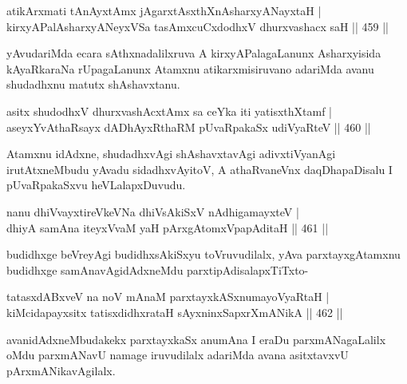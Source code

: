 \begin{shl}
atikArxmati tAnAyxtAmx jAgarxtAsxthXnAsharxyANayxtaH | \\
kirxyAPalAsharxyANeyxVSa tasAmxcuCxdodhxV dhurxvashacx saH \hfill||  459 ||  
\end{shl}

\begin{artha}
yAvudariMda ecara sAthxnadalilxruva A kirxyAPalagaLanunx Asharxyisida kAyaRkaraNa rUpagaLanunx Atamxnu atikarxmisiruvano adariMda avanu shudadhxnu matutx shAshavxtanu.
\end{artha}

\begin{shl}
asitx shudodhxV dhurxvashAcx\s \s tAmx sa ceYka iti yatisxthXtamf | \\
aseyxYvAthaRsayx dADhAyxRthaRM pUvaRpakaSx udiVyaRteV \hfill||  460 ||  
\end{shl}

\begin{artha}
Atamxnu idAdxne, shudadhxvAgi shAshavxtavAgi adivxtiVyanAgi irutAtxneMbudu yAvadu sidadhxvAyitoV, A athaRvaneVnx daqDhapaDisalu I pUvaRpakaSxvu heVLalapxDuvudu.
\end{artha}


\begin{shl}
nanu dhiVvayxtireVkeVNa dhiVsAkiSxV nAdhigamayxteV | \\
dhiyA samAna iteyxVvaM yaH pArxgAtomxVpapAditaH \hfill||  461 ||  
\end{shl}

\begin{artha}
budidhxge beVreyAgi budidhxsAkiSxyu toVruvudilalx, yAva parxtayxgAtamxnu budidhxge samAnavAgidAdxneMdu parxtipAdisalapxTiTxto- 
\end{artha}

\begin{shl}
tatasxdABxveV na noV mAnaM parxtayxkASxnumayoVyaRtaH | \\
kiMcidapayxsitx tatisxdidhxrataH sAyxninxSapxrXmANikA \hfill||  462 ||  
\end{shl}

\begin{artha}
avanidAdxneMbudakekx parxtayxkaSx anumAna I eraDu parxmANagaLalilx oMdu parxmANavU namage iruvudilalx adariMda avana asitxtavxvU pArxmANikavAgilalx.
\end{artha}


